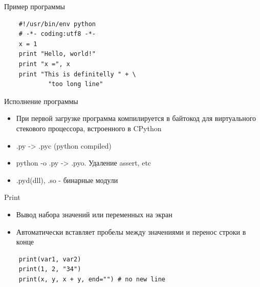 \documentclass{article}
\begin{document}
\begin{center} Пример программы \end{center}
\vspace{15pt}
\begin{lstlisting}
    #!/usr/bin/env python
    # -*- coding:utf8 -*-
    x = 1
    print "Hello, world!"
    print "x =", x
    print "This is definitelly " + \
            "too long line"
\end{lstlisting}
\newpage

\begin{center} Исполнение программы \end{center}
\begin{itemize}
    \item При первой загрузке программа компилируется в байтокод для 
    	виртуального стекового процессора, встроенного в CPython
    \item .py -> .pyc (python compiled)
    \item python -o  .py -> .pyo. Удаление assert, etc
    \item .pyd(dll), .so - бинарные модули
\end{itemize}
\newpage

\begin{center} Print \end{center}
\begin{itemize}
    \item Вывод набора значений или переменных на экран
    \item Автоматически вставляет пробелы между значениями и перенос строки в конце
\end{itemize}
\vspace{15pt}
\begin{lstlisting}
    print(var1, var2)
    print(1, 2, "34")
    print(x, y, x + y, end="") # no new line
\end{lstlisting}
\newpage
\end{document}

